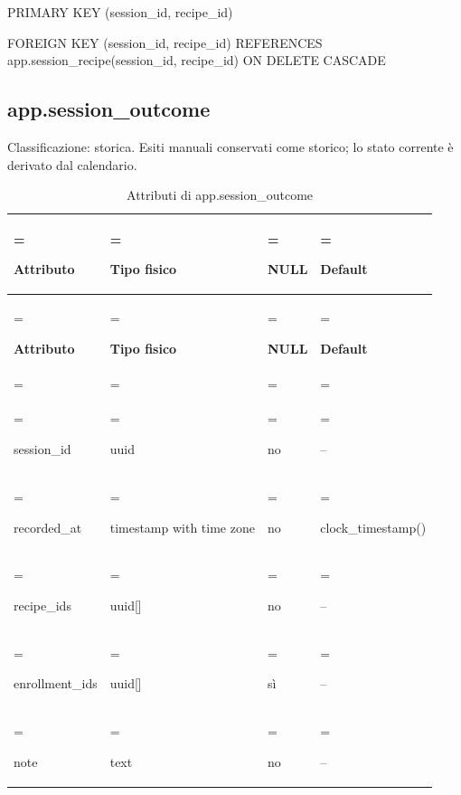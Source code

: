 \documentclass[11pt,a4paper]{article}
\begin{document}
{\ttfamily\small PRIMARY KEY (\allowbreak{}session\_\allowbreak{}id,\allowbreak{} recipe\_\allowbreak{}id)}\par

{\ttfamily\small FOREIGN KEY (\allowbreak{}session\_\allowbreak{}id,\allowbreak{} recipe\_\allowbreak{}id) REFERENCES app.\allowbreak{}session\_\allowbreak{}recipe(\allowbreak{}session\_\allowbreak{}id,\allowbreak{} recipe\_\allowbreak{}id) ON DELETE CASCADE}\par

\subsection{app.session\_outcome}

Classificazione: storica. Esiti manuali conservati come storico; lo stato corrente è derivato dal calendario.

{\small \renewcommand{\arraystretch}{1.2}

\begin{xltabular}{\linewidth}{>{\hsize\linewidth=\hsize\raggedright\arraybackslash}X>{\hsize\linewidth=\hsize\raggedright\arraybackslash}X>{\hsize\linewidth=\hsize\raggedright\arraybackslash}X>{\hsize\linewidth=\hsize\raggedright\arraybackslash}X}
\caption{Attributi di app.session\_outcome}\label{tab:dictionary-24}\\
\toprule

\textbf{Attributo} & \textbf{Tipo fisico} & \textbf{NULL} & \textbf{Default}\\\midrule\endfirsthead\toprule\textbf{Attributo} & \textbf{Tipo fisico} & \textbf{NULL} & \textbf{Default}\\\midrule\endhead
\midrule{}\\\endfoot\bottomrule\endlastfoot


{\ttfamily\small session\_\allowbreak{}id} & {\ttfamily\small uuid} & no & {\ttfamily\small --}\\\addlinespace[3pt]

{\ttfamily\small recorded\_\allowbreak{}at} & {\ttfamily\small timestamp with time zone} & no & {\ttfamily\small clock\_\allowbreak{}timestamp(\allowbreak{})}\\\addlinespace[3pt]

{\ttfamily\small recipe\_\allowbreak{}ids} & {\ttfamily\small uuid[]} & no & {\ttfamily\small --}\\\addlinespace[3pt]

{\ttfamily\small enrollment\_\allowbreak{}ids} & {\ttfamily\small uuid[]} & sì & {\ttfamily\small --}\\\addlinespace[3pt]

{\ttfamily\small note} & {\ttfamily\small text} & no & {\ttfamily\small --}\\*

\end{xltabular}}
\end{document}
